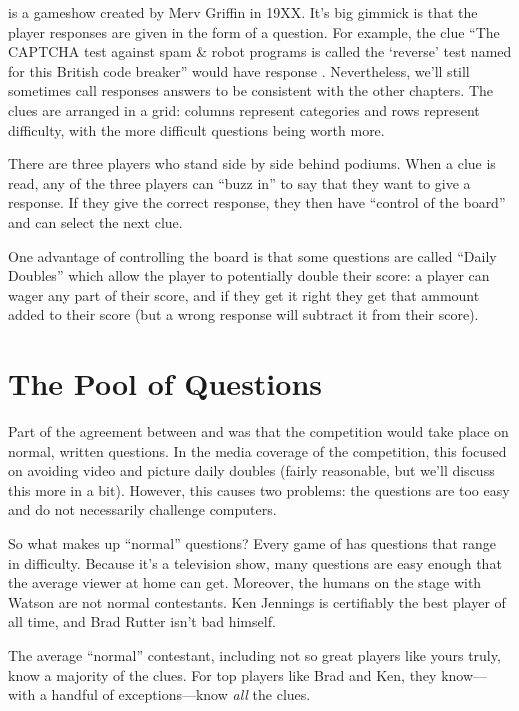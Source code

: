 \jeopardy{} is a gameshow created by Merv Griffin in 19XX.
%
It's big gimmick is that the player responses are given in the form of
a question.
%
For example, the clue ``The CAPTCHA test against spam \& robot programs
is called the `reverse' test named for this British code breaker''
would have response .
%
Nevertheless, we'll still sometimes call responses answers to be consistent with
the other chapters.
%
The clues are arranged in a grid: columns represent categories and
rows represent difficulty, with the more difficult questions being
worth more.

There are three players who stand side by side behind podiums.
%
When a clue is read, any of the three players can ``buzz in'' to say that they want to give a response.
%
If they give the correct response, they then have ``control of the board'' and can select the next clue.

One advantage of controlling the board is that some questions are
called ``Daily Doubles'' which allow the player to potentially double
their score: a player can wager any part of their score, and if they
get it right they get that ammount added to their score (but a wrong
response will subtract it from their score).

\section{The Pool of Questions}

Part of the agreement between \jeopardy{} and  was that the
competition would take place on normal, written questions.
%
In the media coverage of the competition, this focused on avoiding
video and picture daily doubles (fairly reasonable, but we'll discuss
this more in a bit).
%
However, this causes two problems: the questions are too easy and do
not necessarily challenge computers.

So what makes up ``normal'' questions?
%
Every game of \jeopardy{} has questions that range in difficulty.
%
Because it's a television show, many questions are easy enough that
the average viewer at home can get.
%
Moreover, the humans on the stage with Watson are not normal contestants.
%
Ken Jennings is certifiably the best \jeopardy{} player of all time,
and Brad Rutter isn't bad himself.

The average ``normal'' \jeopardy{} contestant, including not so great
players like yours truly, know a majority of the clues.
%
For top players like Brad and Ken, they know---with a handful of
exceptions---know \emph{all} the clues.
%



